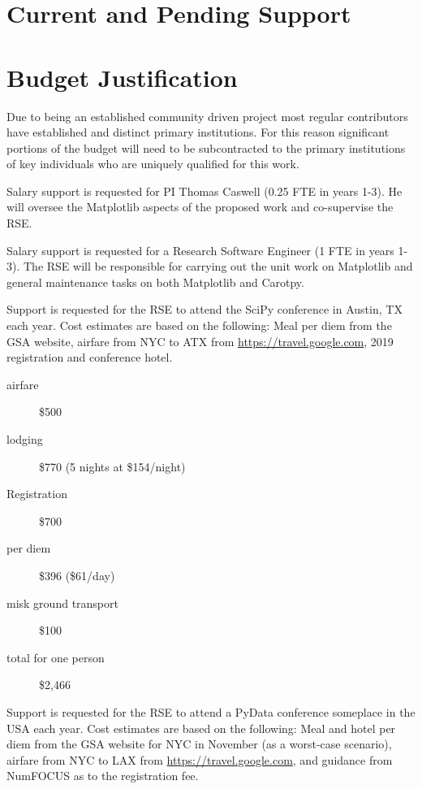 \documentclass[12pt]{article}
\numberwithin{page}{section}
\begin{document}
\newpage
\section{Current and Pending Support}
\setcounter{page}{1}

\newpage
\section{Budget Justification}
\setcounter{page}{1}

Due to being an established community driven project most regular
contributors have established and distinct primary institutions.  For
this reason significant portions of the budget will need to be
subcontracted to the primary institutions of key individuals who are
uniquely qualified for this work.

Salary support is requested for PI Thomas Caswell (0.25 FTE in years
1-3).  He will oversee the Matplotlib aspects of the proposed work and
co-supervise the RSE.

Salary support is requested for a Research Software Engineer (1 FTE in
years 1-3).  The RSE will be responsible for carrying out the unit
work on Matplotlib and general maintenance tasks on both Matplotlib
and Carotpy.

Support is requested for the RSE to attend the SciPy conference in
Austin, TX each year.  Cost estimates are based on the following: Meal
per diem from the GSA website, airfare from NYC to ATX from
\url{https://travel.google.com}, 2019 registration and conference hotel.

\begin{description}
\item[airfare] \$500
\item [lodging] \$770 (5 nights at \$154/night)
\item [Registration] \$700
\item [per diem] \$396 (\$61/day)
\item [misk ground transport] \$100
\item [total for one person] \$2,466
\end{description}

Support is requested for the RSE to attend a PyData conference
someplace in the USA each year.  Cost estimates are based on the
following: Meal and hotel per diem from the GSA website for NYC in
November (as a worst-case scenario), airfare from NYC to LAX from
\url{https://travel.google.com}, and guidance from NumFOCUS as to the
registration fee.
\end{document}

